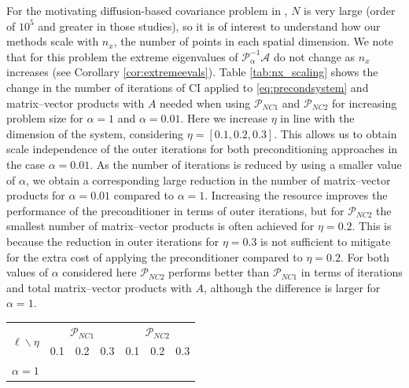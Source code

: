 \documentclass{article}
\newcommand{\sizeA}{N}
\newcommand{\resource}{\eta}
\theoremstyle{definition}
\begin{document}
{		
		For the motivating diffusion-based covariance problem in \cite{weaver_correlation_2016, weaver2018time}, $\sizeA$ is very large (order of $10^5$ and greater in those studies), so it is of interest to understand how our methods scale with $n_x$, the number of points in each spatial dimension. We note that for this problem the extreme eigenvalues of $\mathcal{P}_\alpha^{-1}\mathcal{A}$ do not change as $n_x$ increases (see Corollary \ref{cor:extremeevals}). Table \ref{tab:nx_scaling} shows the change in the number of  iterations of CI applied to \eqref{eq:precondsystem} and matrix--vector products with $A$ needed when using $\mathcal{P}_{NC1}$ and $\mathcal{P}_{NC2}$ for increasing problem size for $\alpha = 1$ and $\alpha = 0.01$. Here we increase $\eta$ in line with the dimension of the system, considering $\resource =  [0.1,0.2,0.3]$. This allows us to obtain scale independence of the outer iterations for both preconditioning approaches in the case $\alpha = 0.01$. As the number of  iterations is reduced by using a smaller value of $\alpha$, we  obtain a corresponding large reduction in the number of matrix--vector products for $\alpha = 0.01$ compared to $\alpha=1$. Increasing the resource improves the performance of the preconditioner in terms of outer iterations, but for $\mathcal{P}_{NC2}$ the smallest number of matrix--vector products is {often} achieved for $\resource=0.2$. This is because the reduction in outer iterations for $\eta = 0.3$ is not sufficient to mitigate for the extra cost of applying the preconditioner compared to $\eta=0.2$. For both values of $\alpha$ considered here  $\mathcal{P}_{NC2}$ performs better than $\mathcal{P}_{NC1}$ in terms of  iterations and total matrix--vector products with ${A}$, although the difference is larger for $\alpha = 1$.
		
		
		
		
		
		
		
		
		\begin{table}[]
			\centering
			\begin{tabular}{c|ccc|ccc}
				\multirow{2}{*}{\Large $\ell \backslash {\resource}$ } &\multicolumn{3}{c|}{$\mathcal{P}_{NC1}$} & \multicolumn{3}{c}{$\mathcal{P}_{NC2}$}\\   
				& 0.1&0.2&0.3 & 0.1&0.2&0.3 \\
				\hline
				$\alpha=1$&&&&&&\\ \hline
				

\end{tabular}
\end{table}}
\end{document}
